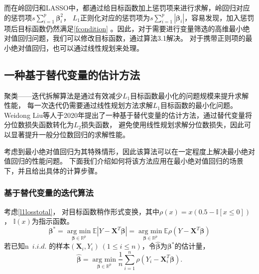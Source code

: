 而在岭回归和LASSO中，都通过给目标函数加上惩罚项来进行求解，岭回归对应的惩罚项$s\sum_{i=1}^p\bm{\beta}_i^2$，
$L_1$正则化对应的惩罚项为$s\sum_{i=1}^p|\bm{\beta}_i|$，容易发现，加入惩罚项后目标函数仍然满足\eqref{fcondition}
。因此，对于需要进行变量筛选的高维最小绝对值回归问题，我们可以修改目标函数，通过算法3.1解决。
对于携带正则项的最小绝对值回归，也可以通过线性规划来处理\cite{wang2006regularized}。

\subsection{一种基于替代变量的估计方法}
聚类——迭代拆解算法是通过有效减少$L_1$目标函数最小化的问题规模来提升求解性能，
每一次迭代仍需要通过线性规划方法求解$L_1$目标函数的最小化问题。
Weidong Liu等人于2020年提出了一种基于替代变量的估计方法，通过替代变量将分位数损失函数转化为$L_2$损失函数，
避免使用线性规划求解分位数损失，因此可以显著提升一般分位数回归的求解性能。

考虑到最小绝对值回归为其特殊情形，因此该算法可以在一定程度上解决最小绝对值回归的性能问题。
下面我们介绍如何将该方法应用在最小绝对值回归的场景下，并且给出具体的计算步骤。

\subsubsection{基于替代变量的迭代算法}
考虑\eqref{l1losstotal}，
对目标函数稍作形式变换，其中$\rho(x) = x(0.5 - \mathbb{I}[x \leq 0])$，
$\mathbb{I}(x)$为指示函数。
\begin{equation}
\bm{\beta}^* = \underset{\bm{\beta} \in \mathbb{R}^{p}}{\operatorname{arg\ min}}\mathbb{E}|Y - \bm{X}^T\bm{\beta}| = 
\underset{\bm{\beta} \in \mathbb{R}^{p}}{\operatorname{arg\ min}}\mathbb{E}\rho(Y - \bm{X}^T\bm{\beta})
\end{equation}
若已知n\ $i.i.d.$ 的样本$(\bm{X}_i, Y_i)\ (1 \leq i \leq n)$，令$\hat{\bm{\beta}}$为$\bm{\beta}^*$的估计量，
\begin{equation}\label{rho-problem}
    \hat{\bm{\beta}} = \underset{\bm{\beta} \in \mathbb{R}^{p}}{\operatorname{arg\ min}}\frac1{n}\sum_{i=1}^{n}\rho(Y_i - \bm{X}_i^T\bm{\beta}).
\end{equation}

